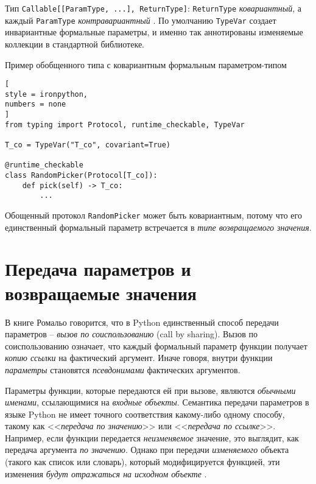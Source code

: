\documentclass[%
	11pt,
	a4paper,
	utf8,
		]{article}
\begin{document}
Тип \verb|Callable[[ParamType, ...], ReturnType]|: \verb|ReturnType| \emph{ковариантный}, а каждый \verb|ParamType| \emph{контравариантный} \cite[]{ramalho:python-2022}. По умолчанию \verb|TypeVar| создает инвариантные формальные параметры, и именно так аннотированы изменяемые коллекции в стандартной библиотеке.

Пример обобщенного типа с ковариантным формальным параметром-типом
\begin{lstlisting}[
style = ironpython,
numbers = none
]
from typing import Protocol, runtime_checkable, TypeVar

T_co = TypeVar("T_co", covariant=True)

@runtime_checkable
class RandomPicker(Protocol[T_co]):
    def pick(self) -> T_co:
        ...
\end{lstlisting}

Обощенный протокол \verb*|RandomPicker| может быть ковариантным, потому что его единственный формальный параметр встречается в \emph{типе возвращаемого значения}.










\section{Передача параметров и возвращаемые значения}

В книге Ромальо \cite[]{ramalho:python-2022} говорится, что в Python единственный способ передачи параметров -- \emph{вызов по соиспользованию} (call by sharing). Вызов по соиспользованию означает, что каждый формальный параметр функции получает \emph{копию ссылки} на фактический аргумент. {\color{blue}Иначе говоря, внутри функции \emph{параметры} становятся \emph{псевдонимами} фактических аргументов}.

Параметры функции, которые передаются ей при вызове, являются \emph{обычными именами}, ссылающимися на \emph{входные объекты}. {\color{blue}Семантика передачи параметров в языке Python не имеет точного соответствия какому-либо одному способу, такому как <<\emph{передача по значению}>> или <<\emph{передача по ссылке}>>}. Например, если функции передается \emph{неизменяемое} значение, это выглядит, как передача аргумента \emph{по значению}. Однако при передачи \emph{изменяемого} объекта (такого как список или словарь), который модифицируется функцией, эти изменения \emph{будут отражаться на исходном объекте} \cite[]{beazley:python-2010}.
\end{document}
